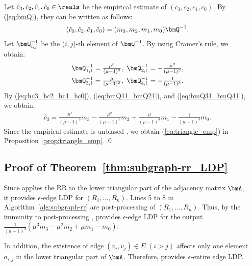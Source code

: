 Let $\hat{c}_3, \hat{c}_2, \hat{c}_1, \hat{c}_0 \in \reals$ be the empirical estimate of $(c_3, c_2, c_1, c_0)$. 
By (\ref{eq:bmQ}), they can be written as follows:
\begin{align}
(\hat{c}_3, \hat{c}_2, \hat{c}_1, \hat{c}_0) = (m_3, m_2, m_1, m_0) \bmQ^{-1}.
\label{eq:hc3_hc2_hc1_hc0}
\end{align}
Let $\bmQ_{i,j}^{-1}$ be the ($i,j$)-th element of $\bmQ^{-1}$. 
By using Cramer's rule, we obtain: 
\begin{align}
\bmQ_{1,1}^{-1} &= \textstyle{\frac{\mu^3}{(\mu-1)^3}},~ \bmQ_{2,1}^{-1} =  \textstyle{-\frac{\mu^2}{(\mu-1)^3}}, \label{eq:bmQ11_bmQ21}\\
\bmQ_{3,1}^{-1} &= \textstyle{\frac{\mu}{(\mu-1)^3}},~ \bmQ_{4,1}^{-1} = \textstyle{-\frac{1}{(\mu-1)^3}}.
\label{eq:bmQ31_bmQ41}
\end{align}
By (\ref{eq:hc3_hc2_hc1_hc0}), (\ref{eq:bmQ11_bmQ21}), and (\ref{eq:bmQ31_bmQ41}), we obtain:
\begin{align*}
\textstyle{\hat{c}_3 = \frac{\mu^3}{(\mu-1)^3} m_3 - \frac{\mu^2}{(\mu-1)^3} m_2 + \frac{\mu}{(\mu-1)^3} m_1 - \frac{1}{(\mu-1)^3} m_0.}
\end{align*}
Since the empirical estimate is unbiased \cite{Kairouz_ICML16,Wang_USENIX17}, we obtain (\ref{eq:triangle_emp}) in Proposition~\ref{prop:triangle_emp}. \qed

\subsection{Proof of Theorem~\ref{thm:subgraph-rr_LDP}}
Since  applies the RR to the lower triangular part of the adjacency matrix $\bmA$, it provides $\epsilon$-edge LDP for $(R_1, \ldots, R_n)$. 
Lines 5 to 8 in Algorithm~\ref{alg:subgraph-rr} are post-processing of $(R_1, \ldots, R_n)$. 
Thus, by the immunity to post-processing \cite{DP},  provides $\epsilon$-edge LDP for the output $\frac{1}{(\mu-1)^3}(\mu^3 m_3 -\mu^2 m_2 + \mu m_1 - m_0)$. 

In addition, the existence of edge $(v_i,v_j) \in E$ $(i>j)$ affects only one element $a_{i,j}$ in the lower triangular part of $\bmA$. 
Therefore,  provides $\epsilon$-entire edge LDP.

